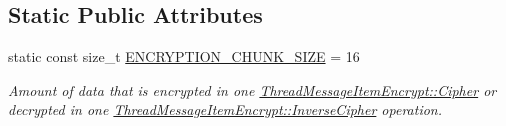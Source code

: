 \subsection*{Static Public Attributes}
\begin{DoxyCompactItemize}
\item 
\hypertarget{class_thread_message_item_encrypt_af5fccc1a171cde8fae18ecbef65c3bb0}{
static const size\_\-t \hyperlink{class_thread_message_item_encrypt_af5fccc1a171cde8fae18ecbef65c3bb0}{ENCRYPTION\_\-CHUNK\_\-SIZE} = 16}
\label{class_thread_message_item_encrypt_af5fccc1a171cde8fae18ecbef65c3bb0}

\begin{DoxyCompactList}\small\item\em Amount of data that is encrypted in one \hyperlink{class_thread_message_item_encrypt_aabb242569b59c0d95e6f84f047e0ea3c}{ThreadMessageItemEncrypt::Cipher} or decrypted in one \hyperlink{class_thread_message_item_encrypt_a8e9f169278706177a7d1aa900935535f}{ThreadMessageItemEncrypt::InverseCipher} operation. \item\end{DoxyCompactList}\end{DoxyCompactItemize}

